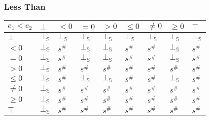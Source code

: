 \documentclass{beamer}
\begin{document}
        \begin{frame}
            \frametitle{Less Than}
        \begin{table}
            \begin{tabular}{|l|l|l|l|l|l|l|l|l|}
            \hline
            $e_1 < e_2$ & $\bot$ & $<0$   & $=0$   & $>0$   & $\le 0$ & $\ne 0$ & $\ge 0$ & $\top$ \\ \hline
            $\bot$      & $\bot_\mathbb{S}$ & $\bot_\mathbb{S}$ & $\bot_\mathbb{S}$ & $\bot_\mathbb{S}$ & $\bot_\mathbb{S}$  & $\bot_\mathbb{S}$  & $\bot_\mathbb{S}$  & $\bot_\mathbb{S}$ \\ \hline
            $<0$        & $\bot_\mathbb{S}$ & $s^\#$ & $\bot_\mathbb{S}$ & $\bot_\mathbb{S}$ & $s^\#$  & $s^\#$  & $\bot_\mathbb{S}$  & $s^\#$ \\ \hline
            $=0$        & $\bot_\mathbb{S}$ & $s^\#$ & $\bot_\mathbb{S}$ & $\bot_\mathbb{S}$ & $s^\#$  & $s^\#$  & $\bot_\mathbb{S}$  & $s^\#$ \\ \hline
            $>0$        & $\bot_\mathbb{S}$ & $s^\#$ & $s^\#$ & $s^\#$ & $s^\#$  & $s^\#$  & $s^\#$  & $s^\#$ \\ \hline
            $\le 0$     & $\bot_\mathbb{S}$ & $s^\#$ & $\bot_\mathbb{S}$ & $\bot_\mathbb{S}$ & $s^\#$  & $s^\#$  & $\bot_\mathbb{S}$  & $s^\#$ \\ \hline
            $\ne 0$     & $\bot_\mathbb{S}$ & $s^\#$ & $s^\#$ & $s^\#$ & $s^\#$  & $s^\#$  & $s^\#$  & $s^\#$ \\ \hline
            $\ge 0$     & $\bot_\mathbb{S}$ & $s^\#$ & $s^\#$ & $s^\#$ & $s^\#$  & $s^\#$  & $s^\#$  & $s^\#$ \\ \hline
            $\top$      & $\bot_\mathbb{S}$ & $s^\#$ & $s^\#$ & $s^\#$ & $s^\#$  & $s^\#$  & $s^\#$  & $s^\#$ \\ \hline
            \end{tabular}
            \end{table}
        \end{frame}
\end{document}
